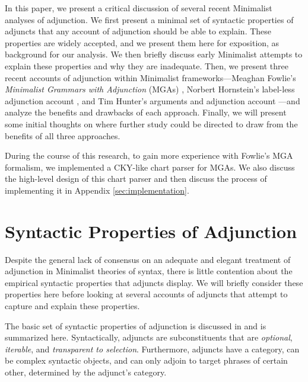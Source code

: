 \documentclass{article}
\begin{document}
In this paper, we present a critical discussion of several recent
Minimalist analyses of adjunction.  We first present a minimal set of
syntactic properties of adjuncts that any account of adjunction should
be able to explain.  These properties are widely accepted, and we
present them here for exposition, as background for our analysis.  We
then briefly discuss early Minimalist attempts to explain these
properties and why they are inadequate.  Then, we present three recent
accounts of adjunction within Minimalist frameworks---Meaghan Fowlie's
\textit{Minimalist Grammars with Adjunction} (MGAs) \cite{fowlie2015},
Norbert Hornstein's label-less adjunction account
\cite{hornstein2008b}, and Tim Hunter's arguments and adjunction
account \cite{hunter2011}---and analyze the benefits and drawbacks of
each approach.  Finally, we will present some initial thoughts on
where further study could be directed to draw from the benefits of all
three approaches.

During the course of this research, to gain more experience with
Fowlie's MGA formalism, we implemented a CKY-like chart parser for
MGAs.  We also discuss the high-level design of this chart parser and
then discuss the process of implementing it in Appendix
\ref{sec:implementation}.


\section{Syntactic Properties of Adjunction}
\label{sec:adjunction-prop}

Despite the general lack of consensus on an adequate and elegant
treatment of adjunction in Minimalist theories of syntax, there is
little contention about the empirical syntactic properties that
adjuncts display.  We will briefly consider these properties here
before looking at several accounts of adjuncts that attempt to capture
and explain these properties.

The basic set of syntactic properties of adjunction is discussed in
\cite{fowlie2015} and is summarized here. Syntactically, adjuncts are
subconstituents that are \textit{optional}, \textit{iterable}, and
\textit{transparent to selection}.  Furthermore, adjuncts have a
category, can be complex syntactic objects, and can only adjoin to
target phrases of certain other, determined by the adjunct's category.
\end{document}

